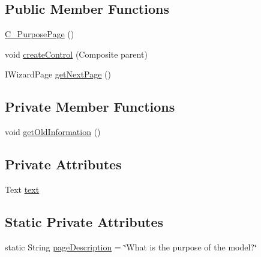 \subsection*{Public Member Functions}
\begin{DoxyCompactItemize}
\item 
\hyperlink{classit_1_1isislab_1_1masonassisteddocumentation_1_1mason_1_1wizards_1_1_c___purpose_page_a5cc12f672a96e503aa641ddf061335c4}{C\-\_\-\-Purpose\-Page} ()
\item 
void \hyperlink{classit_1_1isislab_1_1masonassisteddocumentation_1_1mason_1_1wizards_1_1_c___purpose_page_ab9d7e8c0b517bbbb5c1d1ae4c11d13b7}{create\-Control} (Composite parent)
\item 
I\-Wizard\-Page \hyperlink{classit_1_1isislab_1_1masonassisteddocumentation_1_1mason_1_1wizards_1_1_c___purpose_page_a4ed9bb021ee9454f16449dda33c492de}{get\-Next\-Page} ()
\end{DoxyCompactItemize}
\subsection*{Private Member Functions}
\begin{DoxyCompactItemize}
\item 
void \hyperlink{classit_1_1isislab_1_1masonassisteddocumentation_1_1mason_1_1wizards_1_1_c___purpose_page_a6c01f630e4fd58c3f5640da22772bbc4}{get\-Old\-Information} ()
\end{DoxyCompactItemize}
\subsection*{Private Attributes}
\begin{DoxyCompactItemize}
\item 
Text \hyperlink{classit_1_1isislab_1_1masonassisteddocumentation_1_1mason_1_1wizards_1_1_c___purpose_page_ac7b1a3918766a267a7594f729ea7faac}{text}
\end{DoxyCompactItemize}
\subsection*{Static Private Attributes}
\begin{DoxyCompactItemize}
\item 
static String \hyperlink{classit_1_1isislab_1_1masonassisteddocumentation_1_1mason_1_1wizards_1_1_c___purpose_page_a62e6e8e416e6c87fd490db86b8085533}{page\-Description} = \char`\"{}What is the purpose of the model?\char`\"{}
\end{DoxyCompactItemize}


